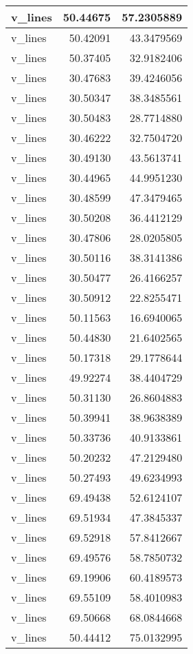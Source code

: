 \documentclass[
]{book}
\theoremstyle{definition}
\theoremstyle{definition}
\theoremstyle{definition}
\theoremstyle{definition}
\theoremstyle{remark}
\begin{document}
\begin{tabular}{l|r|r}
\hline
v\_lines & 50.44675 & 57.2305889\\
\hline
v\_lines & 50.42091 & 43.3479569\\
\hline
v\_lines & 50.37405 & 32.9182406\\
\hline
v\_lines & 30.47683 & 39.4246056\\
\hline
v\_lines & 30.50347 & 38.3485561\\
\hline
v\_lines & 30.50483 & 28.7714880\\
\hline
v\_lines & 30.46222 & 32.7504720\\
\hline
v\_lines & 30.49130 & 43.5613741\\
\hline
v\_lines & 30.44965 & 44.9951230\\
\hline
v\_lines & 30.48599 & 47.3479465\\
\hline
v\_lines & 30.50208 & 36.4412129\\
\hline
v\_lines & 30.47806 & 28.0205805\\
\hline
v\_lines & 30.50116 & 38.3141386\\
\hline
v\_lines & 30.50477 & 26.4166257\\
\hline
v\_lines & 30.50912 & 22.8255471\\
\hline
v\_lines & 50.11563 & 16.6940065\\
\hline
v\_lines & 50.44830 & 21.6402565\\
\hline
v\_lines & 50.17318 & 29.1778644\\
\hline
v\_lines & 49.92274 & 38.4404729\\
\hline
v\_lines & 50.31130 & 26.8604883\\
\hline
v\_lines & 50.39941 & 38.9638389\\
\hline
v\_lines & 50.33736 & 40.9133861\\
\hline
v\_lines & 50.20232 & 47.2129480\\
\hline
v\_lines & 50.27493 & 49.6234993\\
\hline
v\_lines & 69.49438 & 52.6124107\\
\hline
v\_lines & 69.51934 & 47.3845337\\
\hline
v\_lines & 69.52918 & 57.8412667\\
\hline
v\_lines & 69.49576 & 58.7850732\\
\hline
v\_lines & 69.19906 & 60.4189573\\
\hline
v\_lines & 69.55109 & 58.4010983\\
\hline
v\_lines & 69.50668 & 68.0844668\\
\hline
v\_lines & 50.44412 & 75.0132995\\

\end{tabular}
\end{document}
